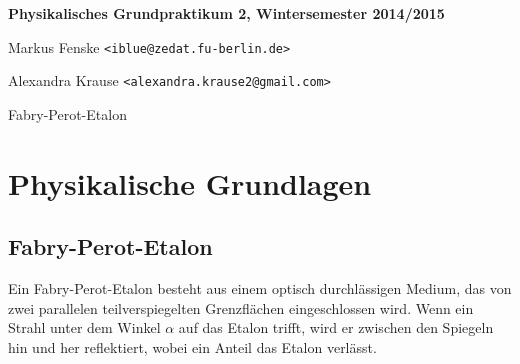 \documentclass[a4paper,german,12pt,smallheadings]{scrartcl}
\begin{document}
\begin{titlepage}

\end{titlepage}

\allowdisplaybreaks %
\begin{center}
\bfseries %
\sffamily %
\vspace{-40pt}
Physikalisches Grundpraktikum 2, Wintersemester 2014/2015

Markus Fenske \texttt{<iblue@zedat.fu-berlin.de>}

Alexandra Krause \texttt{<alexandra.krause2@gmail.com>}

Fabry-Perot-Etalon
\vspace{-10pt}
\end{center}

\section{Physikalische Grundlagen}
\subsection{Fabry-Perot-Etalon}

Ein Fabry-Perot-Etalon besteht aus einem optisch durchlässigen Medium, das von
zwei parallelen teilverspiegelten Grenzflächen eingeschlossen wird. Wenn ein
Strahl unter dem Winkel $\alpha$ auf das Etalon trifft, wird er zwischen den
Spiegeln hin und her reflektiert, wobei ein Anteil das Etalon verlässt.
\end{document}

